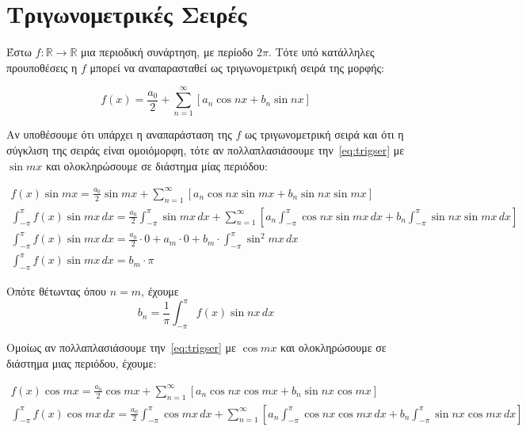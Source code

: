 \section{Τριγωνομετρικές Σειρές}

Έστω $ f \colon \mathbb{R} \to \mathbb{R} $ μια περιοδική συνάρτηση, με περίοδο 
$ 2 \pi $. Τότε υπό κατάλληλες προυποθέσεις η $f$ μπορεί να αναπαρασταθεί ως 
\textcolor{Col1}{τριγωνομετρική} σειρά της μορφής:

\begin{equation}\label{eq:trigser}
    f(x) = \frac{a_{0}}{2} + \sum_{n=1}^{\infty} [a_{n} \cos{nx}  + b_{n} \sin{nx}]
\end{equation} 

Αν υποθέσουμε ότι υπάρχει η αναπαράσταση της $f$ ως τριγωνομετρική σειρά και ότι 
η σύγκλιση της σειράς είναι ομοιόμορφη, τότε αν πολλαπλασιάσουμε την~\eqref{eq:trigser}
με $ \sin{mx} $ και ολοκληρώσουμε σε διάστημα μίας περιόδου: 

\begin{gather*}
    f(x) \sin{mx} = \frac{a_{0}}{2} \sin{mx} + \sum_{n=1}^{\infty} 
    [a_{n} \cos{nx} \sin{mx} + b_{n} \sin{nx} \sin{mx}]   \\
    \int _{- \pi} ^{\pi} f(x) \sin{mx} \,{dx} = \frac{a_{0}}{2} \int _{- \pi}^{\pi} 
    \sin{mx} \,{dx} + \sum_{n=1}^{\infty} \left[a_{n} \int _{- \pi}^{\pi} 
        \cos{nx} \sin{mx}  \,{dx} + b_{n} \int _{- \pi }^{\pi} \sin{nx} \sin{mx} 
    \,{dx}\right] \\
    \int _{- \pi }^{\pi} f(x) \sin{mx} \,{dx} = \frac{a_{0}}{2} \cdot 0 + 
    a_{m}\cdot 0 + b_{m} \cdot \int _{- \pi}^{\pi } \sin^{2}{mx} \,{dx} \\
    \int _{- \pi }^{\pi} f(x) \sin{mx} \,{dx} =  b_{m} \cdot \pi 
\end{gather*}   

Οπότε θέτωντας όπου $ n=m $, έχουμε
\[
    \boxed{b_{n} = \frac{1}{\pi} \int _{- \pi }^{\pi} f(x) \sin{nx} \,{dx}}
\] 

Ομοίως αν πολλαπλασιάσουμε την~\eqref{eq:trigser} με $ \cos{mx} $ και ολοκληρώσουμε 
σε διάστημα μιας περιόδου, έχουμε:

\begin{gather*}
    f(x) \cos{mx} = \frac{a_{0}}{2} \cos{mx} + \sum_{n=1}^{\infty} 
    [a_{n} \cos{nx} \cos{mx} + b_{n} \sin{nx} \cos{mx}]   \\
    \int _{- \pi} ^{\pi} f(x) \cos{mx} \,{dx} = \frac{a_{0}}{2} \int _{- \pi}^{\pi} 
    \cos{mx} \,{dx} + \sum_{n=1}^{\infty} \left[a_{n} \int _{- \pi}^{\pi}
        \cos{nx} \cos{mx}  \,{dx} + b_{n} \int _{- \pi }^{\pi} \sin{nx} \cos{mx} 
    \,{dx}\right] \\
\end{gather*}


